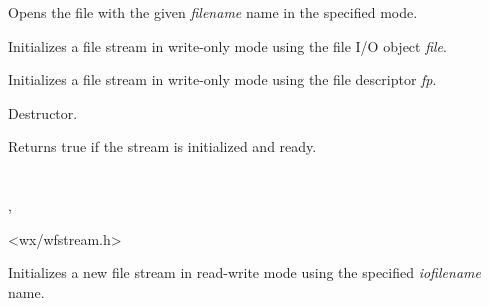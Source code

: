 
\label{wxffileoutputstreamctor}


Opens the file with the given {\it filename} name in the specified mode.


Initializes a file stream in write-only mode using the file I/O object {\it file}.


Initializes a file stream in write-only mode using the file descriptor {\it fp}.

\label{wxffileoutputstreamdtor}


Destructor.

\label{wxffileoutputstreamok}


Returns true if the stream is initialized and ready.

\section{}\label{wxffilestream}


, 


<wx/wfstream.h>




\label{wxffilestreamctor}


Initializes a new file stream in read-write mode using the specified 
{\it iofilename} name.



